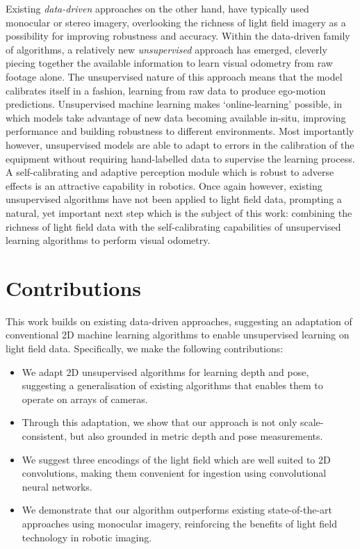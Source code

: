 Existing \textit{data-driven} approaches on the other hand, have typically used monocular or stereo imagery, overlooking the richness of light field imagery as a possibility for improving robustness and accuracy. Within the data-driven family of algorithms, a relatively new \textit{unsupervised} approach has emerged, cleverly piecing together the available information to learn visual odometry from raw footage alone. The unsupervised nature of this approach means that the model calibrates itself in a fashion, learning from raw data to produce ego-motion predictions. Unsupervised machine learning makes `online-learning' possible, in which models take advantage of new data becoming available in-situ, improving performance and building robustness to different environments. Most importantly however, unsupervised models are able to adapt to errors in the calibration of the equipment without requiring hand-labelled data to supervise the learning process. A self-calibrating and adaptive perception module which is robust to adverse effects is an attractive capability in robotics. Once again however, existing unsupervised algorithms have not been applied to light field data, prompting a natural, yet important next step which is the subject of this work: combining the richness of light field data with the self-calibrating capabilities of unsupervised learning algorithms to perform visual odometry.



\section{Contributions}
This work builds on existing data-driven approaches, suggesting an adaptation of conventional 2D machine learning algorithms to enable unsupervised learning on light field data. Specifically, we make the following contributions: 

\begin{itemize}
    \item We adapt 2D unsupervised algorithms for learning depth and pose, suggesting a generalisation of existing algorithms that enables them to operate on arrays of cameras.
    \item Through this adaptation, we show that our approach is not only scale-consistent, but also grounded in metric depth and pose measurements. 
    \item We suggest three encodings of the light field which are well suited to 2D convolutions, making them convenient for ingestion using convolutional neural networks. 
    \item We demonstrate that our algorithm outperforms existing state-of-the-art approaches using monocular imagery, reinforcing the benefits of light field technology in robotic imaging. 

\end{itemize}


